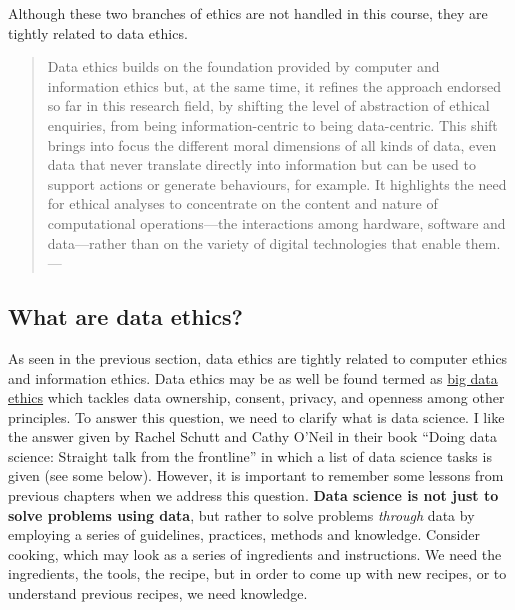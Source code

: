 \documentclass[
]{book}
\begin{document}
Although these two branches of ethics are not handled in this course, they are tightly related to data ethics.

\begin{quote}
Data ethics builds on the foundation provided by computer and information ethics but, at the same time, it refines the approach endorsed so far in this research field, by shifting the level of abstraction of ethical enquiries, from being information-centric to being data-centric. This shift brings into focus the different moral dimensions of all kinds of data, even data that never translate directly into information but can be used to support actions or generate behaviours, for example. It highlights the need for ethical analyses to concentrate on the content and nature of computational operations---the interactions among hardware, software and data---rather than on the variety of digital technologies that enable them. --- \citep{luciano2016data}
\end{quote}

\hypertarget{what-are-data-ethics}{%
\subsection{What are data ethics?}\label{what-are-data-ethics}}

As seen in the previous section, data ethics are tightly related to computer ethics and information ethics. Data ethics may be as well be found termed as \href{https://en.wikipedia.org/wiki/Big_data_ethics}{big data ethics} which tackles data ownership, consent, privacy, and openness among other principles. To answer this question, we need to clarify what is data science. I like the answer given by Rachel Schutt and Cathy O'Neil in their book ``Doing data science: Straight talk from the frontline'' \citep{o2013doing} in which a list of data science tasks is given (see some below). However, it is important to remember some lessons from previous chapters when we address this question. \textbf{Data science is not just to solve problems using data}, but rather to solve problems \emph{through} data by employing a series of guidelines, practices, methods and knowledge. Consider cooking, which may look as a series of ingredients and instructions. We need the ingredients, the tools, the recipe, but in order to come up with new recipes, or to understand previous recipes, we need knowledge.
\end{document}
